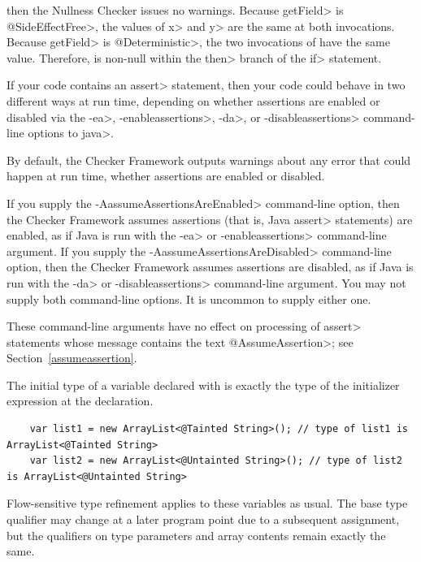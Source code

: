 \noindent
then the Nullness Checker issues no warnings.
Because \<getField> is \<@SideEffectFree>, the values of \<x> and \<y> are the
same at both invocations.
Because \<getField> is \<@Deterministic>, the two invocations of
 have the same value.
Therefore,  is non-null within the \<then> branch
of the \<if> statement.




If your code contains an \<assert> statement, then your code could behave
in two different ways at run time, depending on whether assertions are
enabled or disabled via the \<-ea>, \<-enableassertions>, \<-da>, or
\<-disableassertions> command-line options to \<java>.

By default, the Checker Framework outputs warnings about any error that
could happen at run time, whether assertions are enabled or disabled.

If you supply the \<-AassumeAssertionsAreEnabled> command-line option, then
the Checker Framework assumes assertions (that is, Java \<assert>
statements) are enabled, as if Java is run with the \<-ea> or
\<-enableassertions> command-line argument.  If you supply the
\<-AassumeAssertionsAreDisabled> command-line option, then the Checker
Framework assumes assertions are disabled, as if Java is run with the
\<-da> or \<-disableassertions> command-line argument.  You may not supply
both command-line options.  It is uncommon to supply either one.

These command-line arguments have no effect on processing of \<assert>
statements whose message contains the text \<@AssumeAssertion>; see
Section~\ref{assumeassertion}.



The initial type of a variable declared with  is exactly
the type of the initializer expression at the declaration.

\begin{Verbatim}
    var list1 = new ArrayList<@Tainted String>(); // type of list1 is ArrayList<@Tainted String>
    var list2 = new ArrayList<@Untainted String>(); // type of list2 is ArrayList<@Untainted String>
\end{Verbatim}

Flow-sensitive type refinement applies to these variables as usual.
The base type qualifier may change at a later program point due to
a subsequent assignment, but the qualifiers on type parameters and
array contents remain exactly the same.

